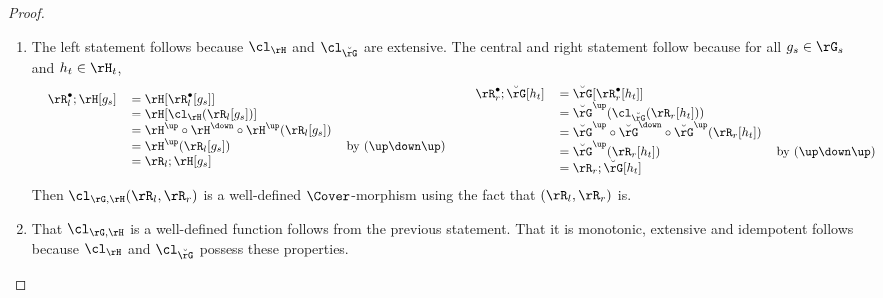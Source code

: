 \documentclass{article}
\begin{document}
\begin{proof}
\item
\begin{enumerate}

\item
The left statement follows because $\cl_\rH$ and $\cl_{\breve{\rG}}$ are extensive. The central and right statement follow because for all $g_s \in \rG_s$ and $h_t \in \rH_t$,
\[
\begin{tabular}{ll}
\begin{tabular}{lll}
$\rR_l^\bullet ; \rH[g_s]$
& $= \rH[\rR_l^\bullet[g_s]]$
\\&
$= \rH[\cl_\rH(\rR_l[g_s])]$
\\&
$= \rH^\up \circ \rH^\down \circ \rH^\up(\rR_l[g_s])$
\\&
$= \rH^\up(\rR_l[g_s])$
& by $(\up\down\up)$
\\&
$= \rR_l ; \rH[g_s]$
\end{tabular}
&
\begin{tabular}{lll}
$\rR_r^\bullet ; \breve{\rG}[h_t]$
& $= \breve{\rG}[\rR_r^\bullet[h_t]]$
\\&
$= \breve{\rG}^\up(\cl_{\breve{\rG}}(\rR_r[h_t])) $
\\&
$= \breve{\rG}^\up \circ \breve{\rG}^\down \circ \breve{\rG}^\up(\rR_r[h_t])$
\\&
$= \breve{\rG}^\up(\rR_r[h_t])$
& by $(\up\down\up)$
\\&
$= \rR_r ; \breve{\rG}[h_t]$
\end{tabular}
\end{tabular}
\]
Then $\cl_{\rG,\rH}(\rR_l,\rR_r)$ is a well-defined $\Cover$-morphism using the fact that $(\rR_l,\rR_r)$ is.

\item
That $\cl_{\rG,\rH}$ is a well-defined function follows from the previous statement. That it is monotonic, extensive and idempotent follows because $\cl_\rH$ and $\cl_{\breve{\rG}}$ possess these properties.


\end{enumerate}
\end{proof}
\end{document}

